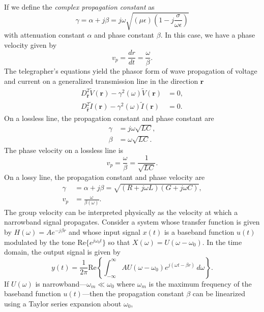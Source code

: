 \documentclass{article}
\begin{document}
If we define the \emph{complex propagation constant} as
\begin{equation}
	\gamma=\alpha+j\beta=j\omega\sqrt{(\mu\epsilon)\left(1-j\frac{\sigma}{\omega\epsilon}\right)}
\end{equation}
with attenuation constant $\alpha$ and phase constant $\beta$. In this case, we have a phase velocity given by
\begin{equation}
	v_p=\frac{dr}{dt}=\frac{\omega}{\beta}.
\end{equation}
The telegrapher's equations yield the phasor form of wave propagation of voltage and current on a generalized transmission line in the direction $\mathbf{r}$
\begin{align}
	D^2_{\hat{\mathbf{r}}}\tilde{V}(\mathbf{r})-\gamma^2(\omega)\tilde{V}(\mathbf{r})&=0,\\
	D^2_{\hat{\mathbf{r}}}\tilde{I}(\mathbf{r})-\gamma^2(\omega)\tilde{I}(\mathbf{r})&=0.
\end{align}
On a lossless line, the propagation constant and phase constant are
\begin{align}
	\gamma&=j\omega\sqrt{LC},\\
	\beta&=\omega\sqrt{LC}.
\end{align}
The phase velocity on a lossless line is
\begin{equation}
	v_p=\frac{\omega}{\beta}=\frac{1}{\sqrt{LC}}.
\end{equation}
On a lossy line, the propagation constant and phase velocity are
\begin{align}
	\gamma&=\alpha+j\beta=\sqrt{(R+j\omega{L})(G+j\omega{C})},\\
	v_p&=\frac{\omega}{\beta(\omega)}.
\end{align}
The group velocity can be interpreted physically as the velocity at which a narrowband signal propagates. Consider a system whose transfer function is given by $H(\omega)=Ae^{-j\beta{r}}$ and whose input signal $x(t)$ is a baseband function $u(t)$ modulated by the tone $\mathrm{Re}\{e^{j\omega_0t}\}$ so that $X(\omega)=U(\omega-\omega_0)$. In the time domain, the output signal is given by
\begin{equation}
	y(t)=\frac{1}{2\pi}\mathrm{Re}\left\{\int^{\infty}_{-\infty}{AU(\omega-\omega_0)e^{j(\omega{t}-\beta{r})}\,d\omega}\right\}.
\end{equation}
If $U(\omega)$ is narrowband---$\omega_m\ll\omega_0$ where $\omega_m$ is the maximum frequency of the baseband function $u(t)$---then the propagation constant $\beta$ can be linearized using a Taylor series expansion about $\omega_0$,
\end{document}
